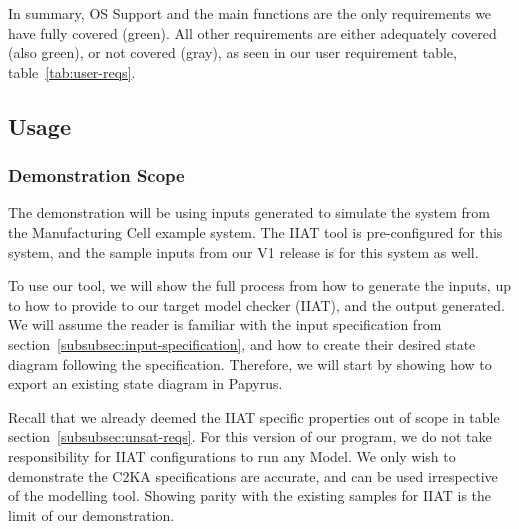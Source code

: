     In summary, OS Support and the main functions are the only requirements we have fully covered (green).
    All other requirements are either adequately covered (also green), or not covered (gray),
    as seen in our user requirement table, table~\ref{tab:user-reqs}.


    \subsection{Usage}\label{subsec:usage}
    \subsubsection{Demonstration Scope}\label{subsubsec:scope}
    The demonstration will be using inputs generated to simulate the system from the Manufacturing Cell example system.%
    The IIAT tool is pre-configured for this system, and the sample inputs from our V1 release is for this system as well.

    To use our tool, we will show the full process from how to generate the inputs,
    up to how to provide to our target model checker (IIAT), and the output generated.
    We will assume the reader is familiar with the input specification from section~\ref{subsubsec:input-specification},
    and how to create their desired state diagram following the specification.
    Therefore, we will start by showing how to export an existing state diagram in Papyrus.

    Recall that we already deemed the IIAT specific properties out of scope in table section~\ref{subsubsec:unsat-reqs}.
    For this version of our program, we do not take responsibility for IIAT configurations to run any Model.
    We only wish to demonstrate the C2KA specifications are accurate, and can be used irrespective of the modelling tool.
    Showing parity with the existing samples for IIAT is the limit of our demonstration.


